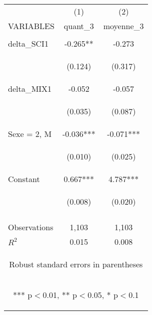\documentclass{article} %
\begin{document}
\begin{table}[H]
\begin{center}
\begin{tabular}{lcc} \hline
 & (1) & (2) \\
VARIABLES & quant\_3 & moyenne\_3 \\ \hline
\vspace{4pt} & \begin{footnotesize}\end{footnotesize} & \begin{footnotesize}\end{footnotesize} \\
delta\_SCI1 & -0.265** & -0.273 \\
\vspace{4pt} & \begin{footnotesize}(0.124)\end{footnotesize} & \begin{footnotesize}(0.317)\end{footnotesize} \\
delta\_MIX1 & -0.052 & -0.057 \\
\vspace{4pt} & \begin{footnotesize}(0.035)\end{footnotesize} & \begin{footnotesize}(0.087)\end{footnotesize} \\
Sexe = 2, M & -0.036*** & -0.071*** \\
\vspace{4pt} & \begin{footnotesize}(0.010)\end{footnotesize} & \begin{footnotesize}(0.025)\end{footnotesize} \\
Constant & 0.667*** & 4.787*** \\
 & \begin{footnotesize}(0.008)\end{footnotesize} & \begin{footnotesize}(0.020)\end{footnotesize} \\
\vspace{4pt} & \begin{footnotesize}\end{footnotesize} & \begin{footnotesize}\end{footnotesize} \\
Observations & 1,103 & 1,103 \\
 $R^2$ & 0.015 & 0.008 \\ \hline
\multicolumn{3}{c}{\begin{footnotesize} Robust standard errors in parentheses\end{footnotesize}} \\
\multicolumn{3}{c}{\begin{footnotesize} *** p$<$0.01, ** p$<$0.05, * p$<$0.1\end{footnotesize}} \\
\end{tabular}
\end{center}




\end{table}
\end{document}
